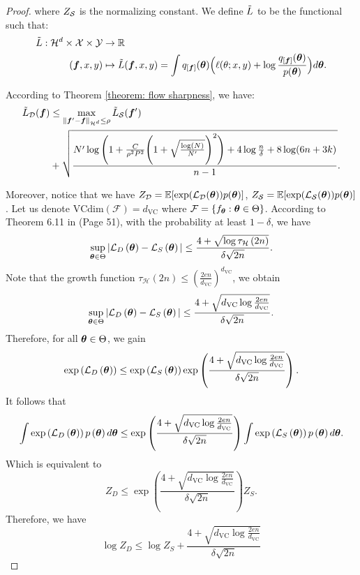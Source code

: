 \begin{proof}
where $Z_{\mathcal{S}}$ is the normalizing constant. We define $\Tilde{L}$ to be the functional such that:
\begin{align*}
    \Tilde{L}: {\mathcal{H}}^d \times {\mathcal{X}} \times {\mathcal{Y}} &\to \mathbb{R}\\
    ({\bm{f}}, x, y) &\mapsto \Tilde{L}({\bm{f}}, x, y) = \int q_{[{\bm{f}}]}({\bm{\theta}})\Big(\ell(\theta; x, y)+\log\frac{q_{[{\bm{f}}]}({\bm{\theta}})}{p({\bm{\theta}})}\Big) d{\bm{\theta}}.
\end{align*}

According to Theorem \ref{theorem: flow sharpness}, we have:
\begin{align}
        \Tilde{L}_{\mathcal{D}}({\bm{f}}) &\leq \max_{\|{\bm{f}}' - {\bm{f}}\|_{{\mathcal{H}}^d} \leq \rho} \Tilde{L}_{\mathcal{S}}({\bm{f}}')\\
        \label{eq: ineq}
         &+ \sqrt{\frac{N' \log \Bigg(1 + \frac{C}{\rho^2 P^2}\Bigg(1+ \sqrt{\frac{\log(N)}{N'}}\Bigg)^2 \Bigg)+4\log\frac{n}{\delta}+8\log(6n+3k)}{n-1}}.
\end{align}

Moreover, notice that we have $Z_{\mathcal{D}} = \mathbb{E}[\exp({\mathcal{L}}_{\mathcal{D}}({\bm{\theta}}))p({\bm{\theta}})]$, $Z_{\mathcal{S}} = \mathbb{E}[\exp({\mathcal{L}}_{\mathcal{S}}({\bm{\theta}}))p({\bm{\theta}})]$. Let us denote $\mathrm{VCdim}(\mathcal{F})=d_{\mathrm{VC}}$ where $\mathcal{F} = \{f_{\bm{\theta}}: {\bm{\theta}} \in \Theta\}$. According to Theorem 6.11 in \cite{uml} (Page 51), with the probability at least $1 - \delta$, we have 
\[
\sup_{{\bm{\theta}}\in\Theta}|\mathcal{L}_{D}\left({\bm{\theta}}\right)-\mathcal{L}_{S}\left({\bm{\theta}}\right)|\leq\frac{4+\sqrt{\log\tau_{\mathcal{H}}\left(2n\right)}}{\delta\sqrt{2n}}.
\]
Note that the growth function $\tau_{\mathcal{H}}\left(2n\right)\leq\left(\frac{2en}{d_{\mathrm{VC}}}\right)^{d_{\mathrm{VC}}}$, we obtain
\[
\sup_{{\bm{\theta}}\in\Theta}|\mathcal{L}_{D}\left({\bm{\theta}}\right)-\mathcal{L}_{S}\left({\bm{\theta}}\right)|\leq\frac{4+\sqrt{d_{\mathrm{VC}}\log\frac{2en}{d_{\mathrm{VC}}}}}{\delta\sqrt{2n}}.
\]
Therefore, for all ${\bm{\theta}} \in \Theta$, we gain
\[
\exp\left(\mathcal{L}_{D}\left({\bm{\theta}}\right)\right)\leq\exp\left(\mathcal{L}_{S}\left({\bm{\theta}}\right)\right)\exp\left(\frac{4+\sqrt{d_{\mathrm{VC}}\log\frac{2en}{d_{\mathrm{VC}}}}}{\delta\sqrt{2n}}\right).
\]
It follows that
\[
\int\exp\left(\mathcal{L}_{D}\left({\bm{\theta}}\right)\right)p\left({\bm{\theta}}\right)d{\bm{\theta}}\leq\exp\left(\frac{4+\sqrt{d_{\mathrm{VC}}\log\frac{2en}{d_{\mathrm{VC}}}}}{\delta\sqrt{2n}}\right)\int\exp\left(\mathcal{L}_{S}\left({\bm{\theta}}\right)\right)p\left({\bm{\theta}}\right)d{\bm{\theta}}.
\]
Which is equivalent to
\[
Z_{D}\leq\exp\left(\frac{4+\sqrt{d_{\mathrm{VC}}\log\frac{2en}{d_{\mathrm{VC}}}}}{\delta\sqrt{2n}}\right)Z_{S}.
\]
Therefore, we have
\begin{equation*}
    \label{ineq: zs_zd}
    \log Z_{D}\leq\log Z_{S}+\frac{4+\sqrt{d_{\mathrm{VC}}\log\frac{2en}{d_{\mathrm{VC}}}}}{\delta\sqrt{2n}}
\end{equation*}



\end{proof}
